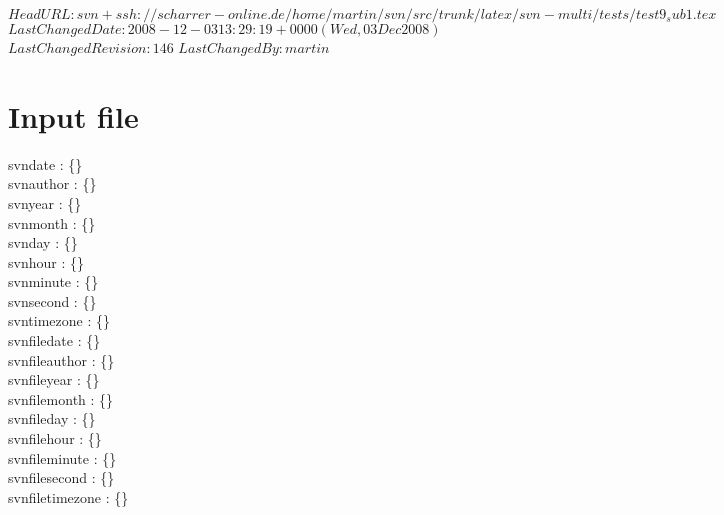 \svnidlong
{$HeadURL: svn+ssh://scharrer-online.de/home/martin/svn/src/trunk/latex/svn-multi/tests/test9_sub1.tex $}
{$LastChangedDate: 2008-12-03 13:29:19 +0000 (Wed, 03 Dec 2008) $}
{$LastChangedRevision: 146 $}
{$LastChangedBy: martin $}

\section{Input file}

\noindent
 svndate : \{\svndate\} \\
 svnauthor : \{\svnauthor\} \\
 svnyear : \{\svnyear\} \\
 svnmonth : \{\svnmonth\} \\
 svnday : \{\svnday\} \\
 svnhour : \{\svnhour\} \\
 svnminute : \{\svnminute\} \\
 svnsecond : \{\svnsecond\} \\
 svntimezone : \{\svntimezone\} \\

\noindent
 svnfiledate : \{\svnfiledate\} \\
 svnfileauthor : \{\svnfileauthor\} \\
 svnfileyear : \{\svnfileyear\} \\
 svnfilemonth : \{\svnfilemonth\} \\
 svnfileday : \{\svnfileday\} \\
 svnfilehour : \{\svnfilehour\} \\
 svnfileminute : \{\svnfileminute\} \\
 svnfilesecond : \{\svnfilesecond\} \\
 svnfiletimezone : \{\svnfiletimezone\} \\

